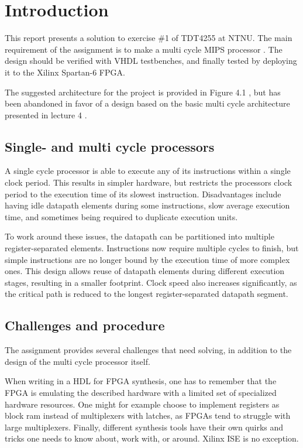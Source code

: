 \section{Introduction}
\label{sec:intro}

This report presents a solution to exercise \#1 of TDT4255 at NTNU.
The main requirement of the assignment is to make a multi cycle MIPS processor \cite[p.47]{compendium}.
The design should be verified with VHDL testbenches, and finally tested by deploying it to the Xilinx Spartan-6 FPGA.

The suggested architecture for the project is provided in Figure 4.1 \cite[p.45]{compendium},
but has been abandoned in favor of a design based on the basic multi cycle architecture presented in lecture 4 \cite{lecture-4}.

\subsection{Single- and multi cycle processors}

A single cycle processor is able to execute any of its instructions within a single clock period.
This results in simpler hardware, but restricts the processors clock period to the execution time of its slowest instruction.
Disadvantages include having idle datapath elements during some instructions, slow average execution time, and sometimes being required to duplicate execution units.

To work around these issues, the datapath can be partitioned into multiple register-separated elements.
Instructions now require multiple cycles to finish, but simple instructions are no longer bound by the execution time of more complex ones.
This design allows reuse of datapath elements during different execution stages, resulting in a smaller footprint.
Clock speed also increases significantly, as the critical path is reduced to the longest register-separated datapath segment.

\subsection{Challenges and procedure}

The assignment provides several challenges that need solving, in addition to the design of the multi cycle processor itself.

When writing in a HDL for FPGA synthesis, one has to remember that the FPGA is emulating the described hardware with a limited set of specialized hardware resources.
One might for example choose to implement registers as block ram instead of multiplexers with latches, as FPGAs tend to struggle with large multiplexers.
Finally, different synthesis tools have their own quirks and tricks one needs to know about, work with, or around.
Xilinx ISE is no exception.

